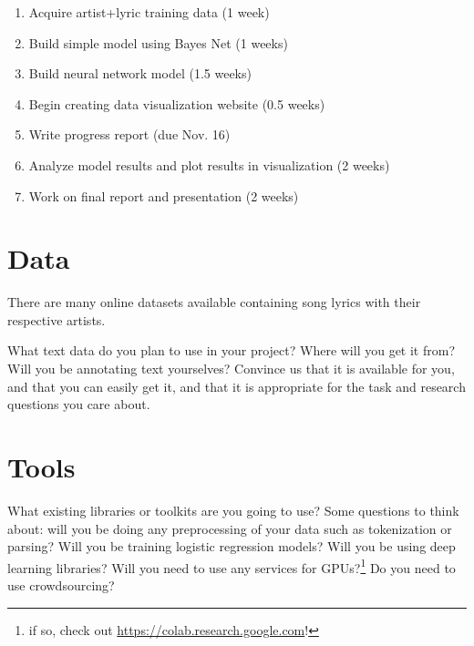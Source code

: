 \documentclass[11pt,a4paper]{article}
\begin{document}
\begin{enumerate}
    \item Acquire artist+lyric training data  (1 week)
    \item Build simple model using Bayes Net (1 weeks)
    \item Build neural network model (1.5 weeks)
    \item Begin creating data visualization website (0.5 weeks)
    \item Write progress report (due Nov. 16)
    \item Analyze model results and plot results in visualization (2 weeks)
    \item Work on final report and presentation (2 weeks)
\end{enumerate}

\section{Data}
There are many online datasets available containing song lyrics with their respective artists.

What text data do you plan to use in your project? Where will you get it from? Will you be annotating text yourselves? Convince us that it is available for you, and that you can easily get it, and that it is appropriate for the task and research questions you care about.

\section{Tools}
What existing libraries or toolkits are you going to use? 
Some questions to think about: will you be doing any preprocessing of your data such as tokenization or parsing? 
Will you be training logistic regression models? Will you be using deep learning libraries? 
Will you need to use any services for GPUs?\footnote{if so, check out \url{https://colab.research.google.com}!} 
Do you need to use crowdsourcing?


\footnotesize

\end{document}
